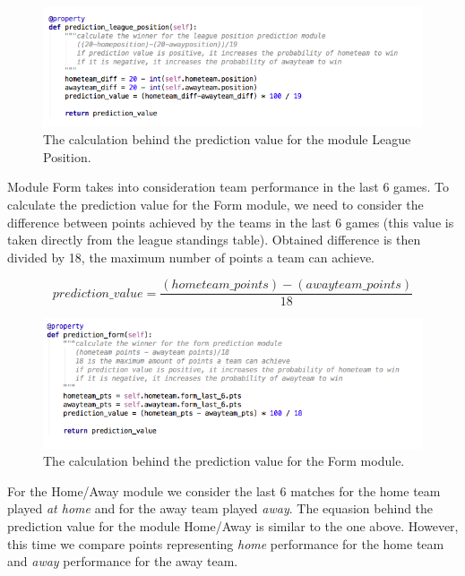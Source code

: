 \begin{figure}[H]
	\begin{center}
		\includegraphics[width=.80\textwidth]{impl/images/predictionLeaguePosition}
		\caption{The calculation behind the prediction value for the module League Position.} \label{fig:using: predictionleagueposition}
	\end{center}
\end{figure}

Module Form takes into consideration team performance in the last 6 games. To calculate the prediction value for the Form module, we need to consider the difference between points achieved by the teams in the last 6 games (this value is taken directly from the league standings table). Obtained difference is then divided by 18, the maximum number of points a team can achieve.

\begin{equation}
   prediction\_value = \frac{(hometeam\_points)-(awayteam\_points)}{18}
\end{equation}


\begin{figure}[H]
	\begin{center}
		\includegraphics[width=.80\textwidth]{impl/images/predictionForm}
		\caption{The calculation behind the prediction value for the Form module.} \label{fig:using: predictionform}
	\end{center}
\end{figure}

For the Home/Away module we consider the last 6 matches for the home team played \emph{at home} and for the away team played \emph{away}. The equasion behind the prediction value for the module Home/Away is similar to the one above. However, this time we compare points representing \emph{home} performance for the home team and \emph{away} performance for the away team. 

